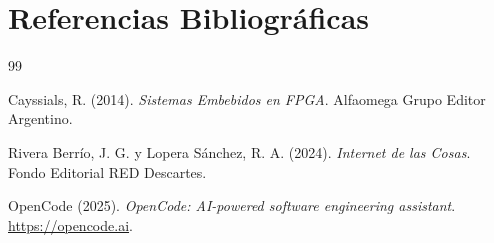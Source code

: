 \documentclass[11pt,a4paper]{article}
\begin{document}
\section{Referencias Bibliogr\'aficas}

\begin{thebibliography}{99}

Cayssials, R. (2014). \textit{Sistemas Embebidos en FPGA}. Alfaomega Grupo Editor Argentino.

Rivera Berr\'io, J. G. y Lopera S\'anchez, R. A. (2024). \textit{Internet de las Cosas}. Fondo Editorial RED Descartes.

OpenCode (2025). \textit{OpenCode: AI-powered software engineering assistant}. \url{https://opencode.ai}.

\end{thebibliography}
\end{document}
